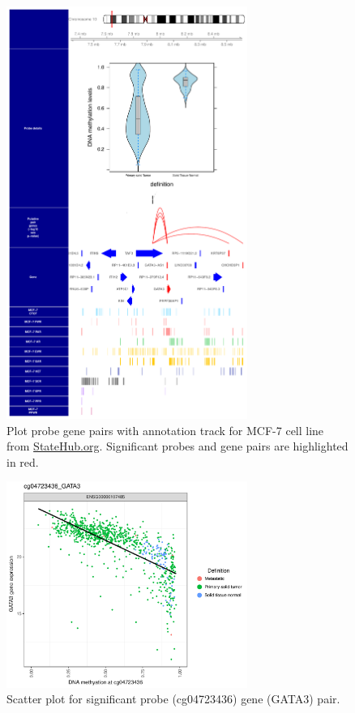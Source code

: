 \begin{figure}[ht!]
\centering
\includegraphics[width=0.7\textwidth]{images/cg04723436_schematic_byProbe.pdf}
\caption{\label{fig:parplot} Plot probe gene pairs with annotation track for MCF-7 cell line from \url{StateHub.org}. Significant probes and gene pairs are highlighted in red.}
\end{figure}


% 


\begin{figure}[ht!]
\centering
\includegraphics[width=0.7\textwidth]{images/cg04723436_GATA3_bypair.pdf}
\caption{\label{fig:scatterplot} Scatter plot for significant probe (cg04723436) gene (GATA3) pair.}
\end{figure}

